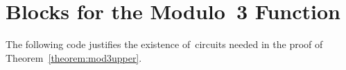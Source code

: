 

\appendix
\section{Blocks for the Modulo~3 Function}
The following code justifies the existence of~circuits needed in the proof of Theorem~\ref{theorem:mod3upper}.
\inputminted{python}{mod3_check.py}

